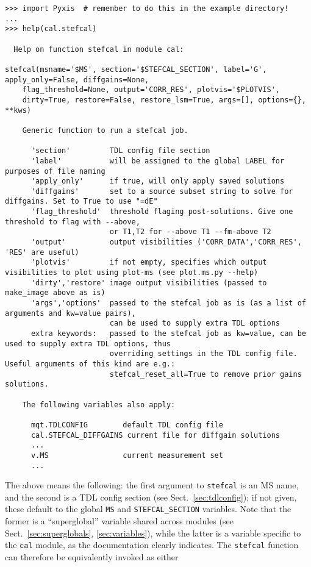 \documentclass[a4paper,10pt]{article}
\begin{document}
{\scriptsize
\begin{verbatim}
>>> import Pyxis  # remember to do this in the example directory!
...
>>> help(cal.stefcal)

  Help on function stefcal in module cal:

stefcal(msname='$MS', section='$STEFCAL_SECTION', label='G', apply_only=False, diffgains=None, 
    flag_threshold=None, output='CORR_RES', plotvis='$PLOTVIS', 
    dirty=True, restore=False, restore_lsm=True, args=[], options={}, **kws)

    Generic function to run a stefcal job.
      
      'section'         TDL config file section
      'label'           will be assigned to the global LABEL for purposes of file naming
      'apply_only'      if true, will only apply saved solutions
      'diffgains'       set to a source subset string to solve for diffgains. Set to True to use "=dE"
      'flag_threshold'  threshold flaging post-solutions. Give one threshold to flag with --above,
                        or T1,T2 for --above T1 --fm-above T2
      'output'          output visibilities ('CORR_DATA','CORR_RES', 'RES' are useful)
      'plotvis'         if not empty, specifies which output visibilities to plot using plot-ms (see plot.ms.py --help) 
      'dirty','restore' image output visibilities (passed to make_image above as is)
      'args','options'  passed to the stefcal job as is (as a list of arguments and kw=value pairs), 
                        can be used to supply extra TDL options
      extra keywords:   passed to the stefcal job as kw=value, can be used to supply extra TDL options, thus
                        overriding settings in the TDL config file. Useful arguments of this kind are e.g.:
                        stefcal_reset_all=True to remove prior gains solutions.
      
    The following variables also apply:
    
      mqt.TDLCONFIG        default TDL config file
      cal.STEFCAL_DIFFGAINS current file for diffgain solutions
      ...
      v.MS                 current measurement set
      ...
\end{verbatim}
}

The above means the following: the first argument to {\tt stefcal} is an MS name, and the second is a TDL config section (see Sect.~\ref{sec:tdlconfig}); if not given, these default to the global {\tt MS} and {\tt STEFCAL\_SECTION} variables. Note that the former is a ``superglobal'' variable shared across modules (see Sect.~\ref{sec:superglobals}, \ref{sec:variables}), while the latter is a variable specific to the {\tt cal} module, as the documentation clearly indicates. The {\tt stefcal} function can therefore be equivalently invoked as either
\end{document}
